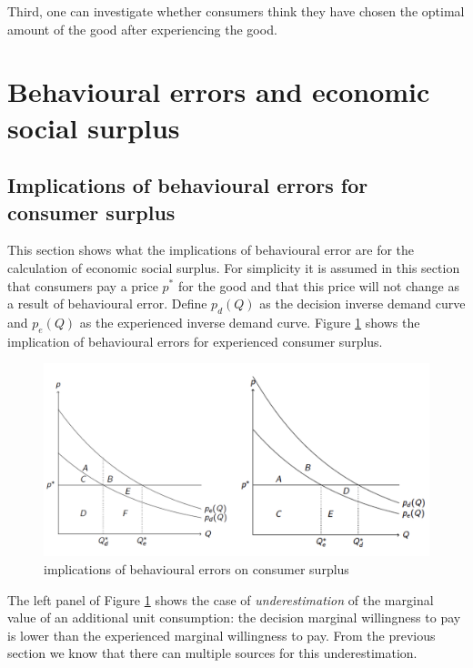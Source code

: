 \documentclass[
]{book}
\begin{document}
Third, one can investigate whether consumers think they have chosen the optimal amount of the good after experiencing the good.

\hypertarget{beherrorsurplus}{%
\section{Behavioural errors and economic social surplus}\label{beherrorsurplus}}

\hypertarget{implications-of-behavioural-errors-for-consumer-surplus}{%
\subsection{Implications of behavioural errors for consumer surplus}\label{implications-of-behavioural-errors-for-consumer-surplus}}

This section shows what the implications of behavioural error are for the calculation of economic social surplus. For simplicity it is assumed in this section that consumers pay a price \(p^*\) for the good and that this price will not change as a result of behavioural error. Define \(p_d (Q)\) as the decision inverse demand curve and \(p_e (Q)\) as the experienced inverse demand curve. Figure \ref{fig:beherrors} shows the implication of behavioural errors for experienced consumer surplus.

\begin{figure}
\includegraphics[width=15.25in]{./figures/beh_errors} \caption{implications of behavioural errors on consumer surplus}\label{fig:beherrors}
\end{figure}

The left panel of Figure \ref{fig:beherrors} shows the case of \emph{underestimation} of the marginal value of an additional unit consumption: the decision marginal willingness to pay is lower than the experienced marginal willingness to pay. From the previous section we know that there can multiple sources for this underestimation.
\end{document}
